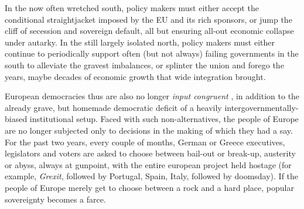 In the now often wretched south, policy makers must either accept the conditional straightjacket imposed by the \gls{EU} and its rich sponsors, or jump the cliff of secession and sovereign default, all but ensuring all-out economic collapse under autarky. In the still largely isolated north, policy makers must either continue to periodically support often (but not always) failing governments in the south to alleviate the gravest imbalances, or splinter the union and forego the years, maybe decades of economic growth that wide integration brought.

European democracies thus are also no longer \emph{input congruent} \citep{Zurn-2000-aa}, in addition to the already grave, but homemade democratic deficit of a heavily intergovernmentally-biased institutional setup. Faced with such non-alternatives, the people of Europe are no longer subjected only to decisions in the making of which they had a say. For the past two years, every couple of months, German or Greece executives, legislators and voters are asked to choose between bail-out or break-up, austerity or abyss, always at gunpoint, with the entire european project held hostage (for example, \emph{Grexit}, followed by Portugal, Spain, Italy, followed by doomsday). If the people of Europe merely get to choose between a rock and a hard place, popular sovereignty becomes a farce.

